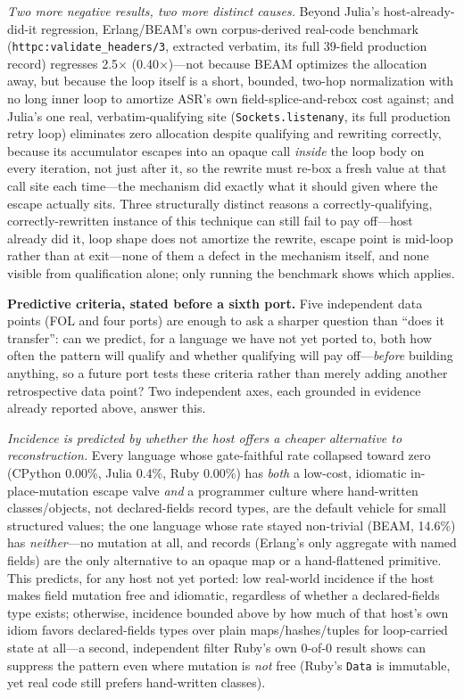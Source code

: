 \documentclass[sigplan,screen,review,anonymous]{acmart}
\begin{document}
\emph{Two more negative results, two more distinct causes.} Beyond
Julia's host-already-did-it regression, Erlang/BEAM's own corpus-derived
real-code benchmark (\texttt{httpc:validate\_headers/3}, extracted
verbatim, its full 39-field production record) regresses 2.5$\times$
(0.40$\times$)---not because BEAM optimizes the allocation away, but
because the loop itself is a short, bounded, two-hop normalization with
no long inner loop to amortize ASR's own field-splice-and-rebox cost
against; and Julia's one real, verbatim-qualifying site
(\texttt{Sockets.listenany}, its full production retry loop) eliminates
zero allocation despite qualifying and rewriting correctly, because its
accumulator escapes into an opaque call \emph{inside} the loop body on
every iteration, not just after it, so the rewrite must re-box a fresh
value at that call site each time---the mechanism did exactly what it
should given where the escape actually sits. Three structurally distinct
reasons a correctly-qualifying, correctly-rewritten instance of this
technique can still fail to pay off---host already did it, loop shape
does not amortize the rewrite, escape point is mid-loop rather than at
exit---none of them a defect in the mechanism itself, and none visible
from qualification alone; only running the benchmark shows which applies.

\textbf{Predictive criteria, stated before a sixth port.}
\label{sec:predict}
Five independent data points (FOL and four ports) are enough to ask a
sharper question than ``does it transfer'': can we predict, for a
language we have not yet ported to, both how often the pattern will
qualify and whether qualifying will pay off---\emph{before} building
anything, so a future port tests these criteria rather than merely adding
another retrospective data point? Two independent axes, each grounded in
evidence already reported above, answer this.

\emph{Incidence is predicted by whether the host offers a cheaper
alternative to reconstruction.} Every language whose gate-faithful rate
collapsed toward zero (CPython 0.00\%, Julia 0.4\%, Ruby 0.00\%) has
\emph{both} a low-cost, idiomatic in-place-mutation escape valve
\emph{and} a programmer culture where hand-written classes/objects, not
declared-fields record types, are the default vehicle for small
structured values; the one language whose rate stayed non-trivial (BEAM,
14.6\%) has \emph{neither}---no mutation at all, and records (Erlang's
only aggregate with named fields) are the only alternative to an opaque
map or a hand-flattened primitive. This predicts, for any host not yet
ported: low real-world incidence if the host makes field mutation free
and idiomatic, regardless of whether a declared-fields type exists;
otherwise, incidence bounded above by how much of that host's own idiom
favors declared-fields types over plain maps/hashes/tuples for
loop-carried state at all---a second, independent filter Ruby's own 0-of-0
result shows can suppress the pattern even where mutation is \emph{not}
free (Ruby's \texttt{Data} is immutable, yet real code still prefers
hand-written classes).
\end{document}
